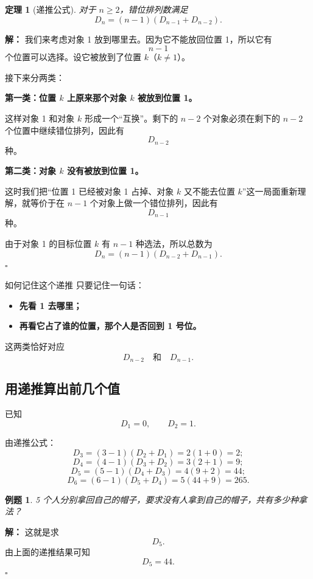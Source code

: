 \documentclass[11pt,a4paper,fontset=fandol]{ctexart}
\theoremstyle{formaltheorem}
\newtheorem{theorem}{定理}[section]
\theoremstyle{formalexample}
\newtheorem{example}{例题}[section]
\newenvironment{solution}{\par\noindent\textbf{解：}}{\hfill$\square$\par}
\newcommand{\Dn}{D_n}
\begin{document}
\begin{theorem}[递推公式]
对于 $n\ge 2$，错位排列数满足
\[
\Dn=(n-1)(D_{n-1}+D_{n-2}).
\]
\end{theorem}

\begin{solution}
我们来考虑对象 1 放到哪里去。因为它不能放回位置 1，所以它有
\[
n-1
\]
个位置可以选择。设它被放到了位置 $k$（$k\ne 1$）。

接下来分两类：

\textbf{第一类：位置 $k$ 上原来那个对象 $k$ 被放到位置 1。}

这样对象 1 和对象 $k$ 形成一个“互换”。剩下的 $n-2$ 个对象必须在剩下的 $n-2$ 个位置中继续错位排列，因此有
\[
D_{n-2}
\]
种。

\textbf{第二类：对象 $k$ 没有被放到位置 1。}

这时我们把“位置 1 已经被对象 1 占掉、对象 $k$ 又不能去位置 $k$”这一局面重新理解，就等价于在 $n-1$ 个对象上做一个错位排列，因此有
\[
D_{n-1}
\]
种。

由于对象 1 的目标位置 $k$ 有 $n-1$ 种选法，所以总数为
\[
\Dn=(n-1)(D_{n-2}+D_{n-1}).
\]
\end{solution}

\begin{skillbox}{如何记住这个递推}
只要记住一句话：
\begin{itemize}
  \item \textbf{先看 1 去哪里；}
  \item \textbf{再看它占了谁的位置，那个人是否回到 1 号位。}
\end{itemize}
这两类恰好对应
\[
D_{n-2}\quad \text{和}\quad D_{n-1}.
\]
\end{skillbox}

\subsection{用递推算出前几个值}

已知
\[
D_1=0,\qquad D_2=1.
\]

由递推公式：
\[
D_3=(3-1)(D_2+D_1)=2(1+0)=2;
\]
\[
D_4=(4-1)(D_3+D_2)=3(2+1)=9;
\]
\[
D_5=(5-1)(D_4+D_3)=4(9+2)=44;
\]
\[
D_6=(6-1)(D_5+D_4)=5(44+9)=265.
\]

\begin{example}
5 个人分别拿回自己的帽子，要求没有人拿到自己的帽子，共有多少种拿法？
\end{example}

\begin{solution}
这就是求
\[
D_5.
\]
由上面的递推结果可知
\[
D_5=44.
\]
\end{solution}
\end{document}
